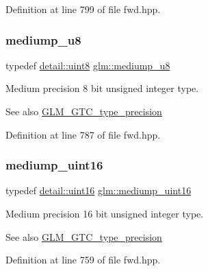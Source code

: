 Definition at line 799 of file fwd.\+hpp.

\mbox{\label{group__gtc__type__precision_gac04b372784392e82bd557f300c4de097}} 
\subsubsection{\texorpdfstring{mediump\_u8}{mediump\_u8}}
{\footnotesize\ttfamily typedef \mbox{\hyperlink{namespaceglm_1_1detail_aef2588f97d090cc19fbbe0c74fe17c8f}{detail\+::uint8}} \mbox{\hyperlink{group__gtc__type__precision_gac04b372784392e82bd557f300c4de097}{glm\+::mediump\+\_\+u8}}}

Medium precision 8 bit unsigned integer type. \begin{DoxySeeAlso}{See also}
\mbox{\hyperlink{group__gtc__type__precision}{G\+L\+M\+\_\+\+G\+T\+C\+\_\+type\+\_\+precision}} 
\end{DoxySeeAlso}


Definition at line 787 of file fwd.\+hpp.

\mbox{\label{group__gtc__type__precision_ga2cef3a0d7b0fce75c9885f64656d8933}} 
\subsubsection{\texorpdfstring{mediump\_uint16}{mediump\_uint16}}
{\footnotesize\ttfamily typedef \mbox{\hyperlink{namespaceglm_1_1detail_a47b2a7d006d187338e8031a352d1ce56}{detail\+::uint16}} \mbox{\hyperlink{group__gtc__type__precision_ga2cef3a0d7b0fce75c9885f64656d8933}{glm\+::mediump\+\_\+uint16}}}

Medium precision 16 bit unsigned integer type. \begin{DoxySeeAlso}{See also}
\mbox{\hyperlink{group__gtc__type__precision}{G\+L\+M\+\_\+\+G\+T\+C\+\_\+type\+\_\+precision}} 
\end{DoxySeeAlso}


Definition at line 759 of file fwd.\+hpp.

\mbox{\label{group__gtc__type__precision_ga0b385466deac5ac96061ef2cdd6db20f}} 
